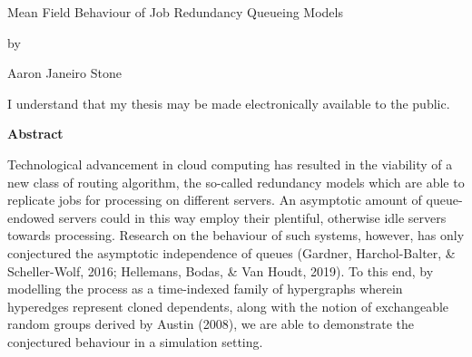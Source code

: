 \pagestyle{empty}


\begin{titlepage}
        \begin{center}
        \vspace*{1.0cm}

        \Huge Mean Field Behaviour of Job Redundancy Queueing Models

        \vspace*{1.0cm}

        \normalsize
        by \\

        \vspace*{1.0cm}

        \Large
        Aaron Janeiro Stone \\

        \vspace*{3.0cm}

       
        \end{center}
\end{titlepage}

\pagestyle{plain}
\setcounter{page}{2}

\cleardoublepage %

 



  \bigskip
  
  \noindent
I understand that my thesis may be made electronically available to the public.

\cleardoublepage


\begin{center}\textbf{Abstract}\end{center}
Technological advancement in cloud computing has resulted in the viability of a new class of
routing algorithm, the so-called redundancy models which are able to replicate jobs for processing on different
servers. An asymptotic amount of queue-endowed servers could in this way employ their plentiful, otherwise
idle servers towards processing.
Research on the behaviour of such systems, however, has only conjectured
the asymptotic independence of queues (Gardner, Harchol-Balter, \& Scheller-Wolf, 2016; Hellemans, Bodas,
\& Van Houdt, 2019).
To this end, by modelling the process as a time-indexed family of hypergraphs wherein
hyperedges represent cloned dependents,  along with the notion of exchangeable
random groups derived by Austin (2008), we are able to demonstrate the conjectured behaviour in a simulation setting.

